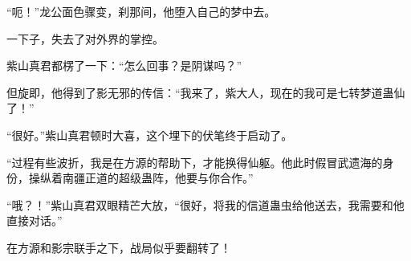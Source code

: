 \begin{this_body}
“呃！”龙公面色骤变，刹那间，他堕入自己的梦中去。

一下子，失去了对外界的掌控。

紫山真君都楞了一下：“怎么回事？是阴谋吗？”

但旋即，他得到了影无邪的传信：“我来了，紫大人，现在的我可是七转梦道蛊仙了！”

“很好。”紫山真君顿时大喜，这个埋下的伏笔终于启动了。

“过程有些波折，我是在方源的帮助下，才能换得仙躯。他此时假冒武遗海的身份，操纵着南疆正道的超级蛊阵，他要与你合作。”

“哦？！”紫山真君双眼精芒大放，“很好，将我的信道蛊虫给他送去，我需要和他直接对话。”

在方源和影宗联手之下，战局似乎要翻转了！

\end{this_body}

